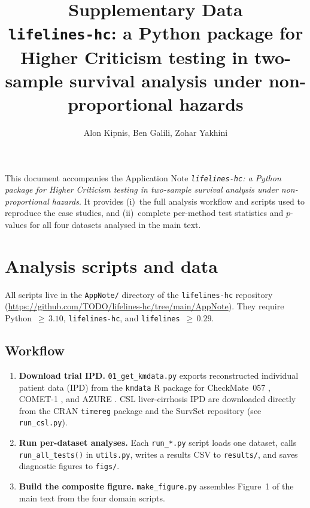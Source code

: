\documentclass[11pt]{article}
\title{Supplementary Data\\[0.4em]
  \large\texttt{lifelines-hc}: a Python package for Higher Criticism
  testing in two-sample survival analysis under non-proportional hazards}
\author{Alon Kipnis, Ben Galili, Zohar Yakhini}
\date{}
\begin{document}
\maketitle

\noindent
This document accompanies the Application Note
\textit{\texttt{lifelines-hc}: a Python package for Higher Criticism testing
in two-sample survival analysis under non-proportional hazards}.
It provides (i)~the full analysis workflow and scripts used to reproduce
the case studies, and (ii)~complete per-method test statistics and
$p$-values for all four datasets analysed in the main text.

\section{Analysis scripts and data}

All scripts live in the \texttt{AppNote/} directory of the
\texttt{lifelines-hc} repository
(\url{https://github.com/TODO/lifelines-hc/tree/main/AppNote}).
They require Python~${\geq}\,3.10$, \texttt{lifelines-hc}, and
\texttt{lifelines}~${\geq}\,0.29$.

\subsection*{Workflow}

\begin{enumerate}
  \item \textbf{Download trial IPD.}
        \texttt{01\_get\_kmdata.py} exports reconstructed individual patient
        data (IPD) from the \texttt{kmdata} R package
        \citep{guyot2012} for CheckMate~057 \citep{borghaei2015},
        COMET-1 \citep{smith2016}, and AZURE
        \citep{coleman2011,coleman2014}.
        CSL liver-cirrhosis IPD are downloaded directly from the CRAN
        \texttt{timereg} package and the SurvSet repository
        \citep{csl_data,survset2022} (see \texttt{run\_csl.py}).
  \item \textbf{Run per-dataset analyses.}
        Each \texttt{run\_*.py} script loads one dataset, calls
        \texttt{run\_all\_tests()} in \texttt{utils.py}, writes a results
        CSV to \texttt{results/}, and saves diagnostic figures to
        \texttt{figs/}.
  \item \textbf{Build the composite figure.}
        \texttt{make\_figure.py} assembles Figure~1 of the main text from
        the four domain scripts.
\end{enumerate}
\end{document}

